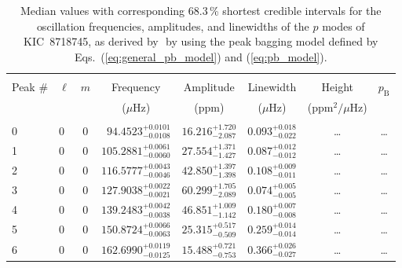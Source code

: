 \begin{table*}[!]
\caption{Median values with corresponding 68.3\,\% shortest credible intervals for the oscillation frequencies, amplitudes, and linewidths of the $p$ modes of KIC~8718745, as derived by \diamonds\,\,by using the peak bagging model defined by Eqs.~(\ref{eq:general_pb_model}) and (\ref{eq:pb_model}).}
\label{tab:8718745p}
\centering
\begin{tabular}{llcrrlrc}
\hline\hline
\\[-8pt]          
Peak \# & $\ell$ & $m$ & \multicolumn{1}{c}{Frequency} & \multicolumn{1}{c}{Amplitude} & \multicolumn{1}{c}{Linewidth} & \multicolumn{1}{c}{Height}& $p_\mathrm{B}$\\
 & & & \multicolumn{1}{c}{($\mu$Hz)} & \multicolumn{1}{c}{(ppm)} & \multicolumn{1}{c}{($\mu$Hz)} & \multicolumn{1}{c}{(ppm$^2/\mu$Hz)}\\
\hline \\[-8pt]
0 & 0 & 0 & $     94.4523_{-      0.0108}^{+      0.0101}$ & $      16.216_{-       2.087}^{+       1.720}$ & $       0.093_{-       0.022}^{+       0.018}$ & \multicolumn{1}{c}{\dots} & \dots \\[1pt]
1 & 0 & 0 & $    105.2881_{-      0.0060}^{+      0.0061}$ & $      27.554_{-       1.427}^{+       1.371}$ & $       0.087_{-       0.012}^{+       0.012}$ & \multicolumn{1}{c}{\dots} & \dots \\[1pt]
2 & 0 & 0 & $    116.5777_{-      0.0046}^{+      0.0043}$ & $      42.850_{-       1.398}^{+       1.397}$ & $       0.108_{-       0.011}^{+       0.009}$ & \multicolumn{1}{c}{\dots} & \dots \\[1pt]
3 & 0 & 0 & $    127.9038_{-      0.0021}^{+      0.0022}$ & $      60.299_{-       2.089}^{+       1.705}$ & $       0.074_{-       0.005}^{+       0.005}$ & \multicolumn{1}{c}{\dots} & \dots \\[1pt]
4 & 0 & 0 & $    139.2483_{-      0.0038}^{+      0.0042}$ & $      46.851_{-       1.142}^{+       1.009}$ & $       0.180_{-       0.008}^{+       0.007}$ & \multicolumn{1}{c}{\dots} & \dots \\[1pt]
5 & 0 & 0 & $    150.8724_{-      0.0063}^{+      0.0066}$ & $      25.315_{-       0.509}^{+       0.517}$ & $       0.259_{-       0.014}^{+       0.014}$ & \multicolumn{1}{c}{\dots} & \dots \\[1pt]
6 & 0 & 0 & $    162.6990_{-      0.0125}^{+      0.0119}$ & $      15.488_{-       0.753}^{+       0.721}$ & $       0.366_{-       0.027}^{+       0.026}$ & \multicolumn{1}{c}{\dots} & \dots \\[1pt]

\end{tabular}
\end{table*}

